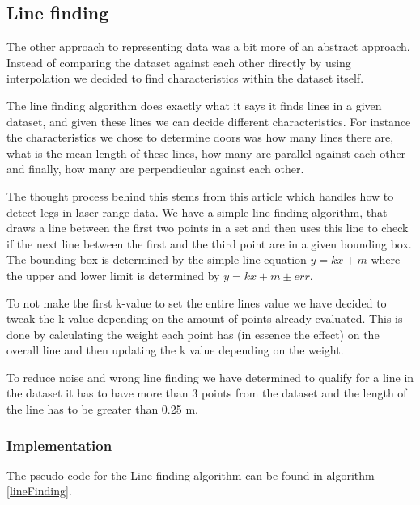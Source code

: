 \documentclass[a4paper, 10pt, conference]{ieeeconf}      %
\begin{document}
\subsection{Line finding}
\label{sec:line_find}
The other approach to representing data was a bit more of an abstract approach. Instead of comparing the dataset against each other directly by using interpolation we decided to find characteristics within the dataset itself. 

The line finding algorithm does exactly what it says it finds lines in a given dataset, and given these lines we can decide different characteristics. For instance the characteristics we chose to determine doors was how many lines there are, what is the mean length of these lines, how many are parallel against each other and finally, how many are perpendicular against each other.

The thought process behind this stems from this article \cite{legfinding} which handles how to detect legs in laser range data. We have a simple line finding algorithm, that draws a line between the first two points in a set and then uses this line to check if the next line between the first and the third point are in a given bounding box. The bounding box is determined by the simple line equation $y = kx + m$ where the upper and lower limit is determined by $y = kx + m \pm err$. 

To not make the first k-value to set the entire lines value we have decided to tweak the k-value depending on the amount of points already evaluated. This is done by calculating the weight each point has (in essence the effect) on the overall line and then updating the k value depending on the weight.

To reduce noise and wrong line finding we have determined to qualify for a line in the dataset it has to have more than 3 points from the dataset and the length of the line has to be greater than 0.25 m.
\subsubsection{Implementation}
The pseudo-code for the Line finding algorithm can be found in algorithm \ref{lineFinding}.
\end{document}
